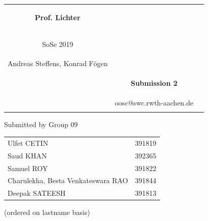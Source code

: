 \documentclass[a4paper,12pt,oneside]{scrreprt}
\begin{document}
\begin{tabular}{ccc}
	\begin{large} \textbf{Prof. Lichter} \end{large} &
	
	\begin{minipage}[H]{3.5cm}
	\centering
		\begin{large} OOSC \end{large} \\
		\begin{large} SoSe 2019\end{large}
	\end{minipage} &
	
	\begin{minipage}[H]{4cm}
	\end{minipage} \\
Andreas Steffens, Konrad F\"ogen &  &  \\
& \begin{huge} \textbf{Submission 2} \end{huge}&  \\
& oosc@swc.rwth-aachen.de &  \\
& & \\
\end{tabular}
\newline \newline \newline

\begin{center}
	Submitted by Group 09
	
	\bigskip
	
	\begin{tabular}{ll}
		Ulfet CETIN & 391819 \\
		Saud KHAN & 392365  \\
		Samuel ROY & 391822 \\
		Charulekha, Besta Venkateswara RAO & 391844 \\
		Deepak SATEESH & 391813  \\
	\end{tabular}
	
	(ordered on lastname basis)
	
\end{center}


\setcounter{chapter}{1} %
	
\end{document}
